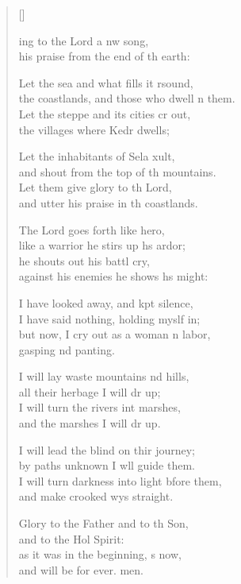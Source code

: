 \settowidth{\versewidth}{I will turn darkness into light before them, *}
\begin{verse}[\versewidth]
  \begin{patverse}
ing to the Lord a nw song,\Med\\
his praise from the end of th earth:

Let the sea and what fills it rsound,\Med\\
the coastlands, and those who dwell \pointup{\i}n them.\\
Let the steppe and its cities cr out,\Med\\
the villages where Kedr dwells;

Let the inhabitants of Sela xult,\Med\\
and shout from the top of th mountains.\\
Let them give glory to th Lord,\Med\\
and utter his praise in th coastlands.

The Lord goes forth like  hero,\Med\\
like a warrior he stirs up h\pointup{\i}s ardor;\\
he shouts out his battl cry,\Med\\
against his enemies he shows h\pointup{\i}s might:

I have looked away, and kpt silence,\Med\\
I have said nothing, holding myslf in;\\
but now, I cry out as a woman \pointup{\i}n labor,\Med\\
gasping nd panting.

I will lay waste mountains nd hills,\Med\\
all their herbage I will dr up;\\
I will turn the rivers int marshes,\Med\\
and the marshes I will dr up.

I will lead the blind on thir journey;\Med\\
by paths unknown I w\pointup{\i}ll guide them.\\
I will turn darkness into light bfore them,\Med\\
and make crooked wys straight.

Glory to the Father and to th Son,\Med\\
    and to the Hol Spirit:\\
as it was in the beginning, \pointup{\i}s now,\Med\\
    and will be for ever. men.
  \end{patverse}
\end{verse}
